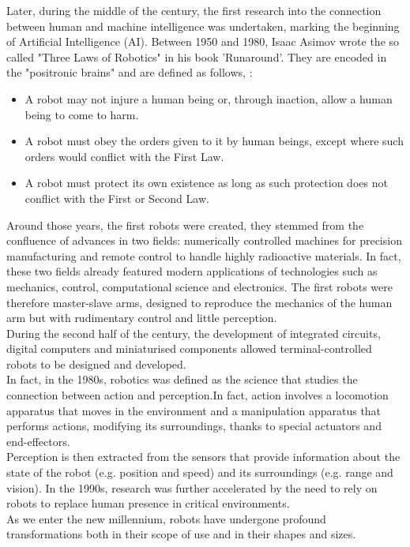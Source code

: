 Later, during the middle of the century, the first research into the connection between human and machine intelligence was undertaken, marking the beginning of Artificial Intelligence (AI).
Between 1950 and 1980, Isaac Asimov wrote the so called "Three Laws of Robotics" in his book 'Runaround'. They are encoded in the "positronic brains" and are defined as follows, \citet{asimov}:
\begin{itemize}
\item A robot may not injure a human being or, through inaction, allow a human
being to come to harm.
\item A robot must obey the orders given to it by human beings, except where
such orders would conflict with the First Law.
\item A robot must protect its own existence as long as such protection does not
conflict with the First or Second Law.
\end{itemize}
Around those years, the first robots were created, they stemmed from the confluence of advances in two fields: numerically controlled machines for precision manufacturing and remote control to handle highly radioactive materials.
In fact, these two fields already featured modern applications of technologies such as mechanics, control, computational science and electronics.
The first robots were therefore master-slave arms, designed to reproduce the mechanics of the human arm but with rudimentary control and little perception.\\
During the second half of the century, the development of integrated circuits, digital computers and miniaturised components allowed terminal-controlled robots to be designed and developed.\\
In fact, in the 1980s, robotics was defined as the science that studies the connection between action and perception.In fact, action involves a locomotion apparatus that moves in the environment and a manipulation apparatus that performs actions, modifying its surroundings, thanks to special actuators and end-effectors.\\
Perception is then extracted from the sensors that provide information about the state of the robot (e.g. position and speed) and its surroundings (e.g. range and vision).
In the 1990s, research was further accelerated by the need to rely on robots to replace human presence in critical environments.\\
As we enter the new millennium, robots have undergone profound transformations both in their scope of use and in their shapes and sizes. 

